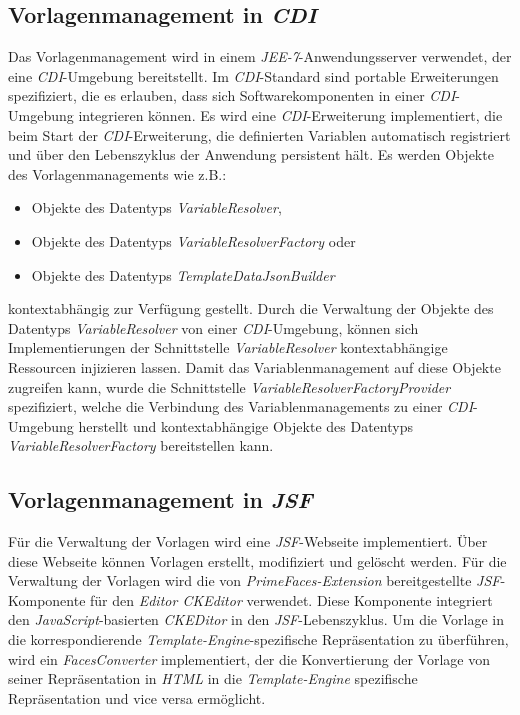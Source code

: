 \subsection{Vorlagenmanagement in \emph{CDI}}
\label{sec:sub-template-management-cdi}
Das Vorlagenmanagement wird in einem \emph{JEE-7}-Anwendungsserver verwendet, der eine \emph{CDI}-Umgebung bereitstellt. Im \emph{CDI}-Standard sind portable Erweiterungen  spezifiziert, die es erlauben, dass sich Softwarekomponenten in einer \emph{CDI}-Umgebung integrieren können. Es wird eine \emph{CDI}-Erweiterung implementiert, die beim Start der \emph{CDI}-Erweiterung, die definierten Variablen automatisch registriert und über den Lebenszyklus der Anwendung persistent hält. Es werden Objekte des Vorlagenmanagements wie z.B.:
\begin{itemize}
	\item Objekte des Datentyps \emph{VariableResolver},
	\item Objekte des Datentyps \emph{VariableResolverFactory} oder
	\item Objekte des Datentyps \emph{TemplateDataJsonBuilder}
\end{itemize}
kontextabhängig zur Verfügung gestellt.
\newline
\newline
Durch die Verwaltung der Objekte des Datentyps \emph{VariableResolver} von einer \emph{CDI}-Umgebung, können sich Implementierungen der Schnittstelle \emph{VariableResolver} kontextabhängige Ressourcen injizieren lassen. Damit das Variablenmanagement auf diese Objekte zugreifen kann, wurde die Schnittstelle \emph{VariableResolverFactoryProvider} spezifiziert, welche die Verbindung des Variablenmanagements zu einer \emph{CDI}-Umgebung herstellt und kontextabhängige Objekte des Datentyps \emph{VariableResolverFactory} bereitstellen kann.

\subsection{Vorlagenmanagement in \emph{JSF}}
\label{sec-sub-specification-jsf}
Für die Verwaltung der Vorlagen wird eine \emph{JSF}-Webseite implementiert. Über diese Webseite können Vorlagen erstellt, modifiziert und gelöscht werden. 
\newline
\newline
Für die Verwaltung der Vorlagen wird die von \emph{PrimeFaces-Extension} bereitgestellte \emph{JSF}-Komponente für den \emph{Editor CKEditor} verwendet. Diese Komponente integriert den \emph{JavaScript}-basierten \emph{CKEDitor} in den \emph{JSF}-Lebenszyklus. 
\newline
\newline
Um die Vorlage in die korrespondierende \emph{Template-Engine}-spezifische Repräsentation zu überführen, wird ein \emph{FacesConverter} implementiert, der die Konvertierung der Vorlage von seiner Repräsentation in \emph{HTML} in die \emph{Template-Engine} spezifische Repräsentation und vice versa ermöglicht.